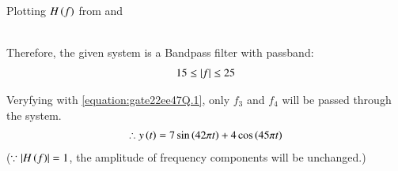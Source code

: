 \documentclass[journal,12pt,twocolumn]{IEEEtran}
\theoremstyle{remark}
\begin{document}
Plotting $H\left(f\right)$ from  and 
   \\
Therefore, the given system is a Bandpass filter with passband: \\
\begin{align}
    15\leq\left\vert f\right\vert\leq 25    \label{equation:gate22ee47Q.1}
\end{align}

Veryfying  with \eqref{equation:gate22ee47Q.1}, only $f_3$ and $f_4$ will be passed through the system. \\
\begin{align}
    \therefore y\left(t\right)=7\sin\left(42\pi t\right)+4\cos\left(45\pi t\right)
\end{align}
($\because\left\vert H\left(f\right)\right\vert=1$, the amplitude of frequency components will be unchanged.)
\end{document}
